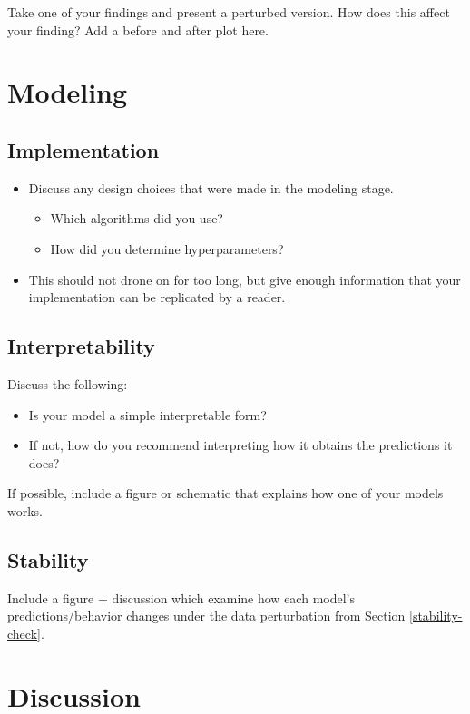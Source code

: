 \documentclass[10pt,letterpaper]{article}
\begin{document}
Take one of your findings and present a perturbed version. How does this
affect your finding? Add a before and after plot here.

\section{Modeling}

\subsection{Implementation}

\begin{itemize}
    \item Discuss any design choices that were made in the modeling stage.
    \begin{itemize}
        \item Which algorithms did you use?
        \item How did you determine hyperparameters? 
    \end{itemize}
    \item This should not drone on for too long, but give enough information that your implementation can be replicated by a reader.
\end{itemize}

\subsection{Interpretability}

Discuss the following:
\begin{itemize}
    \item Is your model a simple interpretable form?
    \item If not, how do you recommend interpreting how it
obtains the predictions it does?
\end{itemize}
If possible, include a figure or schematic that explains how one of your models works.

\subsection{Stability}

Include a figure + discussion which examine how each model's predictions/behavior changes under the data perturbation from Section \ref{stability-check}.

\section{Discussion}\label{discussion}
\end{document}

